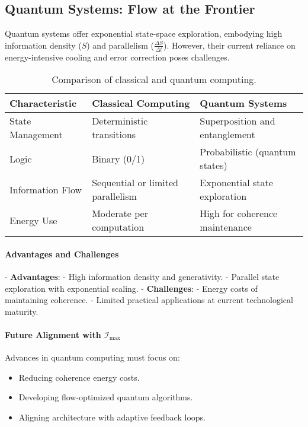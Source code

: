 \documentclass[12pt]{article}
\begin{document}
\subsection{Quantum Systems: Flow at the Frontier}

Quantum systems offer exponential state-space exploration, embodying high information density (\(S\)) and parallelism (\(\frac{\Delta S}{\Delta t}\)). However, their current reliance on energy-intensive cooling and error correction poses challenges.

\begin{table}[h!]
\centering
\begin{tabular}{|l|l|l|}
\hline
\textbf{Characteristic} & \textbf{Classical Computing} & \textbf{Quantum Systems} \\ \hline
State Management & Deterministic transitions & Superposition and entanglement \\ \hline
Logic & Binary (0/1) & Probabilistic (quantum states) \\ \hline
Information Flow & Sequential or limited parallelism & Exponential state exploration \\ \hline
Energy Use & Moderate per computation & High for coherence maintenance \\ \hline
\end{tabular}
\caption{Comparison of classical and quantum computing.}
\end{table}

\paragraph{Advantages and Challenges}
- \textbf{Advantages}:
  - High information density and generativity.
  - Parallel state exploration with exponential scaling.
- \textbf{Challenges}:
  - Energy costs of maintaining coherence.
  - Limited practical applications at current technological maturity.

\paragraph{Future Alignment with \(\mathcal{I}_{\text{max}}\)}
Advances in quantum computing must focus on:
\begin{itemize}
    \item Reducing coherence energy costs.
    \item Developing flow-optimized quantum algorithms.
    \item Aligning architecture with adaptive feedback loops.
\end{itemize}
\end{document}
